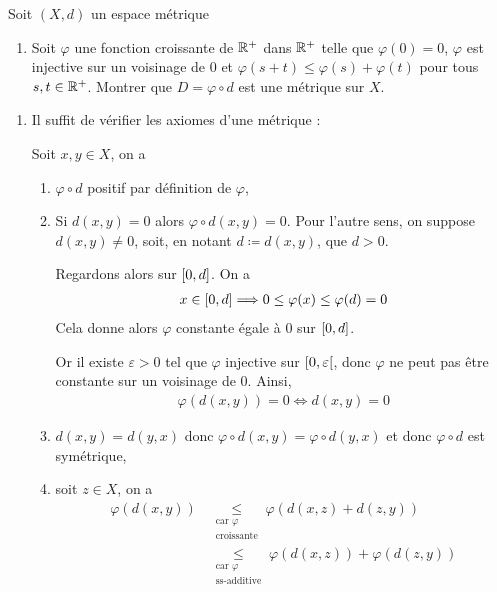 \documentclass[french,a4paper,10pt]{article}
\begin{document}
	\medspace
	\begin{td-exo}
		Soit $(X, d)$ un espace métrique
			\begin{enumerate}
				\item Soit $\varphi$ une fonction croissante de $\mathbb{R}^+$ dans $\mathbb{R}^+$ telle que $\varphi(0)=0$, $\varphi$ est injective sur un voisinage de $0$ et $\varphi(s+t)\le\varphi(s)+\varphi(t)$ pour tous $s,t\in \mathbb{R}^+$. Montrer que $D=\varphi\circ d$ est une métrique sur $X$.
			\end{enumerate}
	\end{td-exo}
	\begin{td-sol}
		\begin{enumerate}
			\item 
				
				Il suffit de vérifier les axiomes d'une métrique :
				
				Soit $x,y\in X$, on a
				\begin{enumerate}[label=$(\roman*)$]
					\item $\varphi\circ d$ positif par définition de $\varphi$,
					
					\item Si $d(x,y)=0$ alors $\varphi\circ d(x,y)=0$. Pour l'autre sens, on suppose $d(x,y)\ne 0$, soit, en notant $d\coloneq d(x,y)$, que $d>0$.
					
					Regardons alors sur $\mathopen{[}0,d\mathclose{]}$. On a
					\[\begin{aligned}
						x\in\mathopen{[}0,d\mathclose{]}\Longrightarrow 0\le\varphi(x)\le\varphi(d)=0
					\end{aligned}\]
					Cela donne alors $\varphi$ constante égale à 0 sur $\mathopen{[}0,d\mathclose{]}$.
					
					Or il existe $\varepsilon>0$ tel que $\varphi$ injective sur $\mathopen{[}0,\varepsilon\mathclose{[}$, donc $\varphi$ ne peut pas être constante sur un voisinage de $0$. Ainsi,
					\[\begin{aligned}
						\varphi(d(x,y))=0\Longleftrightarrow d(x,y)=0
					\end{aligned}\]
					
					\item $d(x,y)=d(y,x)$ donc $\varphi\circ d(x,y)=\varphi\circ d(y,x)$ et donc $\varphi\circ d$ est symétrique,
					
					\item soit $z\in X$, on a
					\[\begin{aligned}
						\varphi(d(x,y))&\underset{\substack{\text{car }\varphi\\\text{croissante}}}{\le} \varphi(d(x,z)+d(z,y))\\
						&\underset{\substack{\text{car }\varphi\\\text{ss-additive}}}{\le} \varphi(d(x,z))+\varphi(d(z,y))
					\end{aligned}\]
				\end{enumerate}
			

\end{enumerate}
\end{td-sol}
\end{document}

